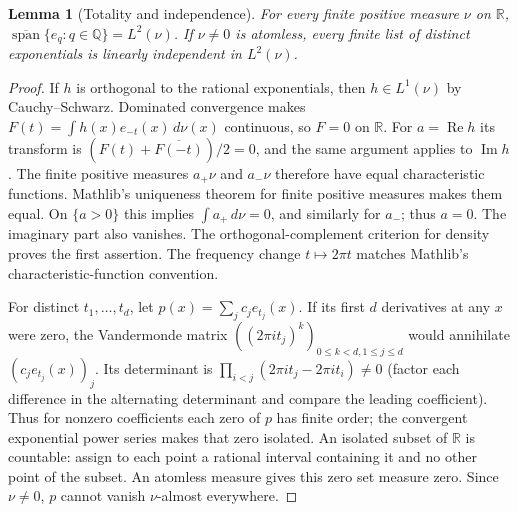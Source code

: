 \documentclass[reqno,a4paper,12pt]{amsart}
\newtheorem{lemma}[theorem]{Lemma}
\newcommand{\R}{\mathbb R}
\newcommand{\Q}{\mathbb Q}
\newcommand{\spn}{\operatorname{span}}
\begin{document}
\begin{lemma}[Totality and independence]\label{characters}
For every finite positive measure $\nu$ on $\R$,
$\overline{\spn}\{e_q:q\in\Q\}=L^2(\nu)$.
If $\nu\ne0$ is atomless, every finite list of distinct exponentials
is linearly independent in $L^2(\nu)$.
\end{lemma}
\begin{proof}
If $h$ is orthogonal to the rational exponentials, then $h\in L^1(\nu)$
by Cauchy--Schwarz. Dominated convergence makes
$F(t)=\int h(x)e_{-t}(x)\,d\nu(x)$ continuous, so $F=0$ on $\R$.
For $a=\operatorname{Re}h$ its transform is
$(F(t)+\overline{F(-t)})/2=0$, and the same argument applies to
$\operatorname{Im}h$. The finite positive measures $a_+\nu$ and $a_-\nu$
therefore have equal characteristic functions. Mathlib's uniqueness
theorem for finite positive measures makes them equal. On $\{a>0\}$
this implies $\int a_+\,d\nu=0$, and similarly for $a_-$; thus $a=0$.
The imaginary part also vanishes. The orthogonal-complement criterion
for density proves the first assertion. The frequency change $t\mapsto2\pi t$
matches Mathlib's characteristic-function convention.

For distinct $t_1,\ldots,t_d$, let $p(x)=\sum_jc_je_{t_j}(x)$.
If its first $d$ derivatives at any $x$ were zero, the Vandermonde matrix
$((2\pi it_j)^k)_{0\le k<d,1\le j\le d}$ would annihilate
$(c_je_{t_j}(x))_j$. Its determinant is
$\prod_{i<j}(2\pi it_j-2\pi it_i)\ne0$ (factor each difference in the
alternating determinant and compare the leading coefficient).
Thus for nonzero coefficients each zero of $p$ has finite order;
the convergent exponential power series makes that zero isolated.
An isolated subset of $\R$ is countable: assign to each point a rational
interval containing it and no other point of the subset.
An atomless measure gives this zero set measure zero. Since $\nu\ne0$,
$p$ cannot vanish $\nu$-almost everywhere.
\end{proof}
\end{document}
